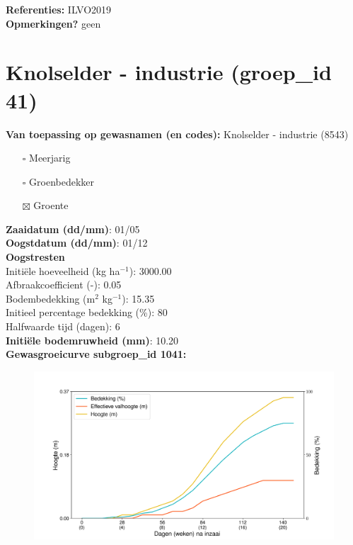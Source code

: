 \documentclass{article}
\begin{document}
  \textbf{Referenties:} ILVO2019 \vspace{0.10cm} \\ 
  \textbf{Opmerkingen?} geen \vspace{0.10cm} \\ 
 \newpage 
 \section{Knolselder - industrie (groep\_id 41)} 
 \textbf{Van toepassing op gewasnamen (en codes):} Knolselder - industrie (8543) 
 \begin{multicols}{3} \begin{itemize} \item[$\square$] Meerjarig \item[$\square$] Groenbedekker \item[$\boxtimes$] Groente \end{itemize} \end{multicols} 
  \textbf{Zaaidatum (dd/mm)}: 01/05  \vspace{0.10cm} \\ 
  \textbf{Oogstdatum (dd/mm)}: 01/12  \vspace{0.10cm} \\ 
  \textbf{Oogstresten} \vspace{0.05cm} \\ 
  \tab Initi\"{e}le hoeveelheid (kg ha$^{-1}$): 3000.00 \vspace{0.05cm} \\ 
  \tab Afbraakcoefficient (-): 0.05 \vspace{0.05cm} \\ 
  \tab Bodembedekking (m$^2$ kg$^{-1}$): 15.35 \vspace{0.05cm} \\ 
  \tab Initieel percentage bedekking (\%): 80 \vspace{0.05cm} \\ 
  \tab Halfwaarde tijd (dagen): 6 \vspace{0.05cm} \\ 
  \textbf{Initi\"{e}le bodemruwheid (mm)}: 10.20 \vspace{0.05cm} \\ 
  \textbf{Gewasgroeicurve subgroep\_id 1041:} 
 \begin{center} \begin{figure}[H] \includegraphics[width=12.5cm]{temp/1041.png} \end{figure} \end{center} 
\end{document}
